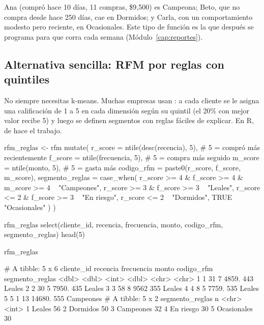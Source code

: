 Ana (compró hace 10 días, 11 compras, \$9{,}500) es Campeona; Beto, que no
compra desde hace 250 días, cae en Dormidos; y Carla, con un comportamiento
modesto pero reciente, en Ocasionales. Este tipo de función es la que después
se programa para que corra cada semana (Módulo~\ref{cap:reportes}).

\subsection{Alternativa sencilla: RFM por reglas con quintiles}

No siempre necesitas k-means. Muchas empresas usan : a
cada cliente se le asigna una calificación de 1 a 5 en cada dimensión según su
quintil (el 20\% con mejor valor recibe 5) y luego se definen segmentos con
reglas fáciles de explicar. En R,  de  hace el
trabajo.

\begin{rcode}
rfm_reglas <- rfm %
  mutate(
    r_score = ntile(desc(recencia), 5),   # 5 = compró más recientemente
    f_score = ntile(frecuencia, 5),       # 5 = compra más seguido
    m_score = ntile(monto, 5),            # 5 = gasta más
    codigo_rfm = paste0(r_score, f_score, m_score),
    segmento_reglas = case_when(
      r_score >= 4 & f_score >= 4 & m_score >= 4 ~ "Campeones",
      r_score >= 3 & f_score >= 3                ~ "Leales",
      r_score <= 2 & f_score >= 3                ~ "En riesgo",
      r_score <= 2                               ~ "Dormidos",
      TRUE                                       ~ "Ocasionales"
    )
  )

rfm_reglas %
  select(cliente_id, recencia, frecuencia, monto, codigo_rfm,
         segmento_reglas) %
  head(5)

rfm_reglas %
\end{rcode}

\begin{rsalida}
# A tibble: 5 x 6
  cliente_id recencia frecuencia  monto codigo_rfm segmento_reglas
       <dbl>    <dbl>      <int>  <dbl> <chr>      <chr>          
1          1       31          7  4859. 443        Leales         
2          2       30          5  7950. 435        Leales         
3          3       58          8  9562  355        Leales         
4          4        8          5  7759. 535        Leales         
5          5        1         13 14680. 555        Campeones      
# A tibble: 5 x 2
  segmento_reglas     n
  <chr>           <int>
1 Leales             56
2 Dormidos           50
3 Campeones          32
4 En riesgo          30
5 Ocasionales        30
\end{rsalida}

